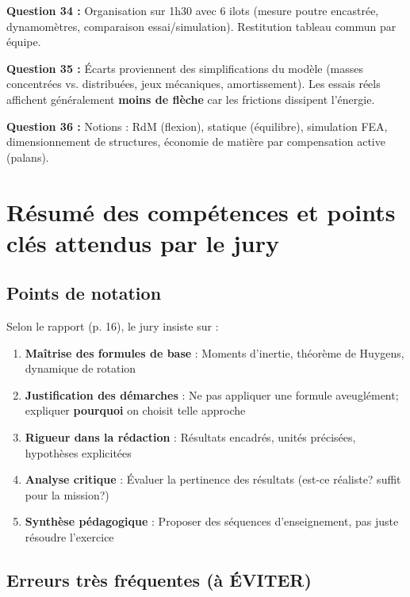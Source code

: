 \documentclass[12pt,a4paper,twoside]{article}
\begin{document}
\begin{correction}
  \textbf{Question 34 :} Organisation sur 1h30 avec 6 ilots (mesure poutre encastrée, dynamomètres, comparaison essai/simulation). Restitution tableau commun par équipe.

  \textbf{Question 35 :} Écarts proviennent des simplifications du modèle (masses concentrées vs. distribuées, jeux mécaniques, amortissement). Les essais réels affichent généralement \textbf{moins de flèche} car les frictions dissipent l'énergie.

  \textbf{Question 36 :} Notions : RdM (flexion), statique (équilibre), simulation FEA, dimensionnement de structures, économie de matière par compensation active (palans).
\end{correction}

\newpage

\section{Résumé des compétences et points clés attendus par le jury}

\subsection*{Points de notation}

Selon le rapport (p. 16), le jury insiste sur :

\begin{enumerate}
  \item \textbf{Maîtrise des formules de base} : Moments d'inertie, théorème de Huygens, dynamique de rotation
  \item \textbf{Justification des démarches} : Ne pas appliquer une formule aveuglément; expliquer \textbf{pourquoi} on choisit telle approche
  \item \textbf{Rigueur dans la rédaction} : Résultats encadrés, unités précisées, hypothèses explicitées
  \item \textbf{Analyse critique} : Évaluer la pertinence des résultats (est-ce réaliste? suffit pour la mission?)
  \item \textbf{Synthèse pédagogique} : Proposer des séquences d'enseignement, pas juste résoudre l'exercice
\end{enumerate}

\subsection*{Erreurs très fréquentes (à ÉVITER)}
\end{document}

